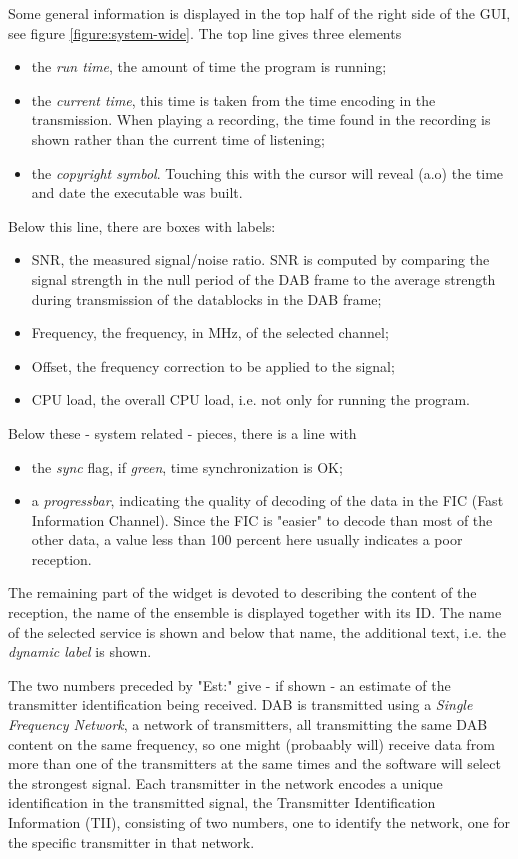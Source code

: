 \documentclass[12pt]{article}
\begin{document}
Some general information is displayed in the top half of
the right side of the GUI, see figure \ref{figure:system-wide}.
The top line gives three elements
\begin{itemize}
\item the {\em run time}, the amount of time the program is running;
\item the {\em current time}, this time is taken from the time
encoding in the transmission. When playing a recording, the time found
in the recording is shown rather than the current time of listening;
\item the {\em copyright symbol}. Touching this with the cursor will reveal (a.o)
the time and date the executable was built.
\end{itemize}
Below this line, there are boxes with labels:
\begin{itemize}
\item SNR, the measured signal/noise ratio. SNR is computed by comparing
the signal strength in the null period of the DAB frame to
the average strength during transmission of the datablocks in the DAB frame;
\item Frequency, the frequency, in MHz, of the selected channel;
\item Offset, the frequency correction to be applied to the signal;
\item CPU load, the overall CPU load, i.e. not only for running the program.
\end{itemize}
\par
Below these - system related - pieces, there is a line with 
\begin{itemize}
\item the {\em sync} flag, if {\em green}, time synchronization is OK;
\item a {\em progressbar}, indicating the quality of
decoding of the data in the FIC (Fast Information Channel).
Since the FIC is "easier" to decode than
most of the other data, a value less than 100 percent here usually indicates
a poor reception.
\end{itemize}
\par
The remaining part of the widget is devoted to describing
the content of the reception,
the name of the ensemble is displayed together with its ID.
The name of the selected service is shown and below that name, the additional
text, i.e. the {\em dynamic label} is shown.
\par
The two numbers preceded by "Est:" give - if shown -
an estimate of the transmitter identification being received.
DAB is transmitted
using a {\em Single Frequency Network}, a network of transmitters, all
transmitting the same DAB content on the same frequency,
so one might (probaably will) receive data from more
than one of the transmitters at the same times and the software will
select the strongest signal.
Each transmitter in the network encodes a unique identification in
the transmitted signal,
the Transmitter Identification Information (TII), consisting of
two numbers, one to identify the network, one for the specific transmitter in that
network.
\end{document}
